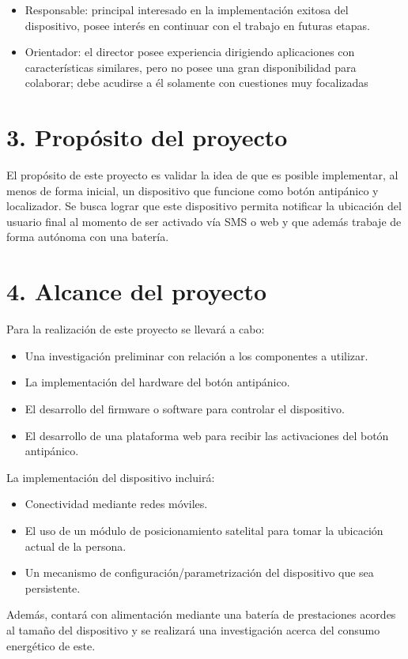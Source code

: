 \documentclass[
11pt, %
]{charter}
\begin{document}
\begin{itemize}
	\item Responsable: principal interesado en la implementación exitosa del dispositivo, posee interés en continuar con el trabajo en futuras etapas.
	\item Orientador: el director posee experiencia dirigiendo aplicaciones con características similares, pero no posee una gran disponibilidad para colaborar; debe acudirse a él solamente con cuestiones muy focalizadas
\end{itemize}


\section{3. Propósito del proyecto}
\label{sec:proposito}

El propósito de este proyecto es validar la idea de que es posible implementar, al menos de forma inicial, un dispositivo que funcione como botón antipánico y localizador. Se busca lograr que este dispositivo permita notificar la ubicación del usuario final al momento de ser activado vía SMS o web y que además trabaje de forma autónoma con una batería.

\section{4. Alcance del proyecto}
\label{sec:alcance}

Para la realización de este proyecto se llevará a cabo:
\begin{itemize}
	\item Una investigación preliminar con relación a los componentes a utilizar.
	\item La implementación del hardware del botón antipánico.
	\item El desarrollo del firmware o software para controlar el dispositivo.
	\item El desarrollo de una plataforma web para recibir las activaciones del botón antipánico.
\end{itemize}

La implementación del dispositivo incluirá:
\begin{itemize}
	\item Conectividad mediante redes móviles.
	\item El uso de un módulo de posicionamiento satelital para tomar la ubicación actual de la persona.
	\item Un mecanismo de configuración/parametrización del dispositivo que sea persistente.
\end{itemize}
Además, contará con alimentación mediante una batería de prestaciones acordes al tamaño del dispositivo y se realizará una investigación acerca del consumo energético de este.
\end{document}
